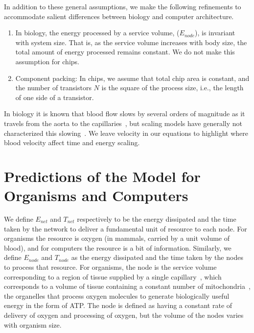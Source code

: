 \documentclass[12pt]{article}
\begin{document}
In addition to these general assumptions, we make the following
refinements to accommodate salient differences between biology and computer architecture.
\begin{enumerate}
\item In biology, the energy processed by a service volume,
  ($E_{node}$), is invariant with system size. That is, as the service volume
  increases with body size, the total amount of energy processed
  remains constant.   We do not make this assumption for chips.

\item Component packing: In chips, we assume that total chip area is constant, and the
  number of transistors $N$ is the square of the process size, i.e.,
  the length of one side of a transistor. 

\end{enumerate}

\noindent 

In biology it is known that blood flow slows by several orders of magnitude as
it travels from the aorta to the capillaries~\cite{west97}, but scaling models
have generally not characterized this slowing~\cite{west97, banavar10}. We leave velocity in
our equations to highlight where blood velocity affect time and energy
scaling.

\section{Predictions of the Model for Organisms and Computers}

We define $E_{net}$ and $T_{net}$ respectively to be the energy dissipated and
the time taken by the network to deliver a fundamental unit of resource to each node.  For
organisms the resource is oxygen (in mammals, carried by a unit volume of
blood), and for computers the resource is a bit of information.
Similarly, we define $E_{node}$ and $T_{node}$ as the energy dissipated and the
time taken by the nodes to process that resource.  For organisms, the node is
the service volume corresponding to a region of tissue supplied by a single
capillary~\cite{banavar10}, which corresponds to a volume of tissue containing a constant number
of mitochondria~\cite{west2002allometric}, the organelles that process oxygen molecules to generate
biologically useful energy in the form of ATP.  The node is defined as having a constant
rate of delivery of oxygen and processing of oxygen, but the
volume of the nodes varies with organism size. 
\end{document}
